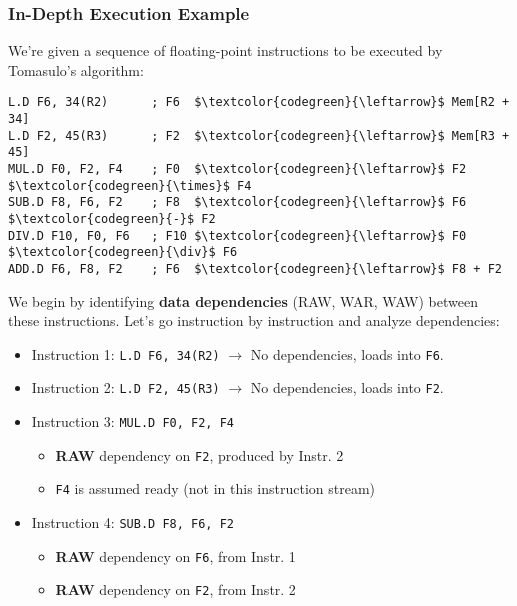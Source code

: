\subsubsection{In-Depth Execution Example}

\begin{examplebox}
    We're given a sequence of floating-point instructions to be executed by Tomasulo's algorithm:
\begin{lstlisting}[language=unknown, mathescape=true]
L.D F6, 34(R2)      ; F6  $\textcolor{codegreen}{\leftarrow}$ Mem[R2 + 34]
L.D F2, 45(R3)      ; F2  $\textcolor{codegreen}{\leftarrow}$ Mem[R3 + 45]
MUL.D F0, F2, F4    ; F0  $\textcolor{codegreen}{\leftarrow}$ F2 $\textcolor{codegreen}{\times}$ F4
SUB.D F8, F6, F2    ; F8  $\textcolor{codegreen}{\leftarrow}$ F6 $\textcolor{codegreen}{-}$ F2
DIV.D F10, F0, F6   ; F10 $\textcolor{codegreen}{\leftarrow}$ F0 $\textcolor{codegreen}{\div}$ F6
ADD.D F6, F8, F2    ; F6  $\textcolor{codegreen}{\leftarrow}$ F8 + F2
\end{lstlisting}
    We begin by identifying \textbf{data dependencies} (RAW, WAR, WAW) between these instructions. Let's go instruction by instruction and analyze dependencies:
    \begin{itemize}
        \item Instruction 1: \texttt{L.D F6, 34(R2)} $\rightarrow$ No dependencies, loads into \texttt{F6}.
        
        \item Instruction 2: \texttt{L.D F2, 45(R3)} $\rightarrow$ No dependencies, loads into \texttt{F2}.
        
        \item Instruction 3: \texttt{MUL.D F0, F2, F4}
        \begin{itemize}
            \item \textbf{RAW} dependency on \texttt{F2}, produced by Instr. 2
            \item \texttt{F4} is assumed ready (not in this instruction stream)
        \end{itemize}
        
        \item Instruction 4: \texttt{SUB.D F8, F6, F2}
        \begin{itemize}
            \item \textbf{RAW} dependency on \texttt{F6}, from Instr. 1
            \item \textbf{RAW} dependency on \texttt{F2}, from Instr. 2
        \end{itemize}


\end{itemize}
\end{examplebox}
